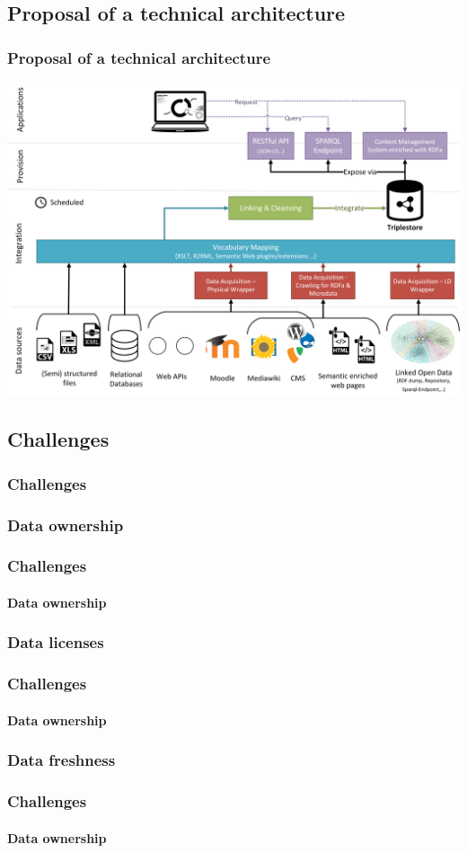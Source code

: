 \documentclass{beamer}
\begin{document}
\subsection{Proposal of a technical architecture}
\begin{frame}
\frametitle{Proposal of a technical architecture}
	\includegraphics[width=\columnwidth]{../images/technical-architecture/lod_technical_architecture.png}
\end{frame}

\subsection{Challenges}
\begin{frame}
\frametitle{Challenges}
\end{frame}

\subsubsection{Data ownership}
\begin{frame}
\frametitle{Challenges}
\framesubtitle{Data ownership}
\end{frame}

\subsubsection{Data licenses}
\begin{frame}
\frametitle{Challenges}
\framesubtitle{Data ownership}
\end{frame}

\subsubsection{Data freshness}
\begin{frame}
\frametitle{Challenges}
\framesubtitle{Data ownership}
\end{frame}
\end{document}
